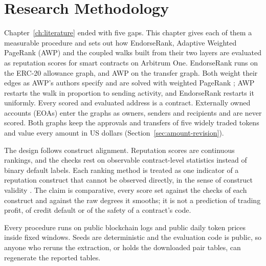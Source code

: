 \chapter{Research Methodology}
\label{ch:methodology}

Chapter~\ref{ch:literature} ended with five gaps. This chapter gives each of them a measurable procedure and sets out how EndorseRank, Adaptive Weighted PageRank (AWP) and the coupled walks built from their two layers are evaluated as reputation scores for smart contracts on Arbitrum One. EndorseRank runs on the ERC-20 allowance graph, and AWP \parencite{do2023awp} on the transfer graph. Both weight their edges as AWP's authors specify and are solved with weighted PageRank \parencite{page1999pagerank}; AWP restarts the walk in proportion to sending activity, and EndorseRank restarts it uniformly. Every scored and evaluated address is a contract. Externally owned accounts (EOAs) enter the graphs as owners, senders and recipients and are never scored. Both graphs keep the approvals and transfers of five widely traded tokens and value every amount in US dollars (Section~\ref{sec:amount-revision}).

The design follows construct alignment. Reputation scores are continuous rankings, and the checks rest on observable contract-level statistics instead of binary default labels. Each ranking method is treated as one indicator of a reputation construct that cannot be observed directly, in the sense of construct validity \parencite{cronbach1955construct}. The claim is comparative, every score set against the checks of each construct and against the raw degrees it smooths; it is not a prediction of trading profit, of credit default or of the safety of a contract's code.

Every procedure runs on public blockchain logs and public daily token prices inside fixed windows. Seeds are deterministic and the evaluation code is public, so anyone who reruns the extraction, or holds the downloaded pair tables, can regenerate the reported tables.

